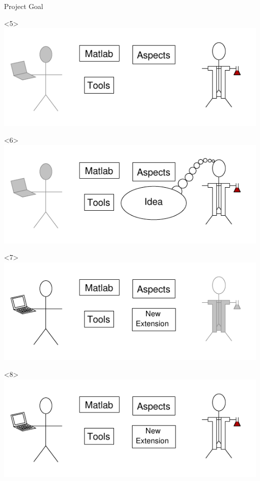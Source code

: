 \begin{frame}{Project Goal}
\begin{center}
\begin{onlyenv}
    \end{onlyenv}
    \begin{onlyenv}<5>
      \includegraphics{images/perspectives5_sci.pdf}
    \end{onlyenv}
    \begin{onlyenv}<6>
      \includegraphics{images/perspectives6_sci.pdf}
    \end{onlyenv}
    \begin{onlyenv}<7>
      \includegraphics{images/perspectives7_comp.pdf}
    \end{onlyenv}
    \begin{onlyenv}<8>
      \includegraphics{images/perspectives_base.pdf}
    \end{onlyenv}
  \end{center}
\end{frame}

